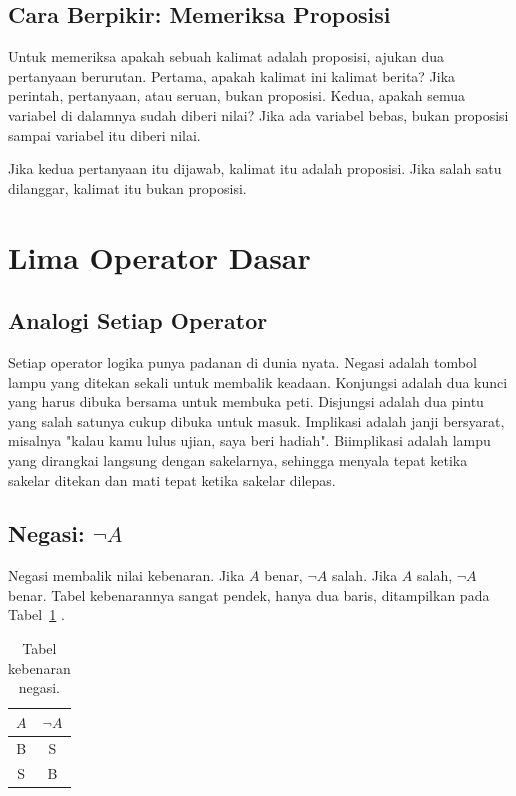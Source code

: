 \documentclass[11pt,a4paper]{article}
\begin{document}
\subsection{Cara Berpikir: Memeriksa Proposisi}

Untuk memeriksa apakah sebuah kalimat adalah proposisi, ajukan dua pertanyaan berurutan. Pertama, apakah kalimat ini kalimat berita? Jika perintah, pertanyaan, atau seruan, bukan proposisi. Kedua, apakah semua variabel di dalamnya sudah diberi nilai? Jika ada variabel bebas, bukan proposisi sampai variabel itu diberi nilai.

Jika kedua pertanyaan itu dijawab, kalimat itu adalah proposisi. Jika salah satu dilanggar, kalimat itu bukan proposisi.

\section{Lima Operator Dasar}

\subsection{Analogi Setiap Operator}

Setiap operator logika punya padanan di dunia nyata. Negasi adalah tombol lampu yang ditekan sekali untuk membalik keadaan. Konjungsi adalah dua kunci yang harus dibuka bersama untuk membuka peti. Disjungsi adalah dua pintu yang salah satunya cukup dibuka untuk masuk. Implikasi adalah janji bersyarat, misalnya "kalau kamu lulus ujian, saya beri hadiah". Biimplikasi adalah lampu yang dirangkai langsung dengan sakelarnya, sehingga menyala tepat ketika sakelar ditekan dan mati tepat ketika sakelar dilepas.

\subsection{Negasi: $\neg A$}

Negasi membalik nilai kebenaran. Jika $A$ benar, $\neg A$ salah. Jika $A$ salah, $\neg A$ benar. Tabel kebenarannya sangat pendek, hanya dua baris, ditampilkan pada Tabel~\ref{tab:negasi} \cite{rosen}.

\begin{table}[H]
	\centering
	\caption{Tabel kebenaran negasi.}
	\label{tab:negasi}
	\small
	\begin{tabular}{c c}
		\toprule
		$A$ & $\neg A$ \\
		\midrule
		B & S \\
		S & B \\
		\bottomrule
	\end{tabular}
\end{table}
\end{document}

